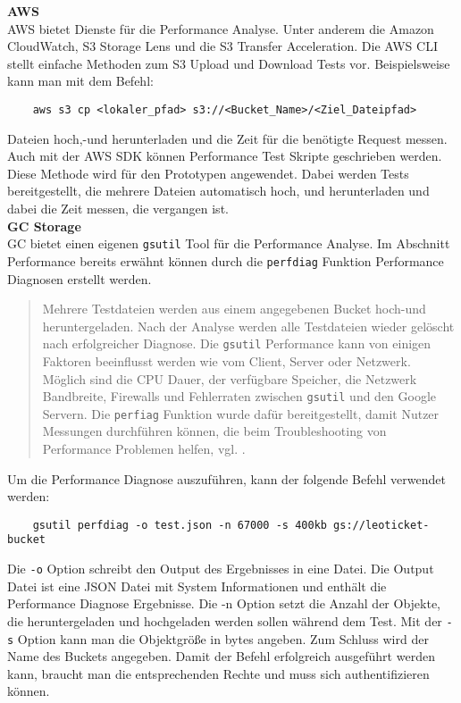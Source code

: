 \textbf{AWS}\\

AWS bietet Dienste für die Performance Analyse. Unter anderem die Amazon CloudWatch, S3 Storage Lens und die S3 Transfer Acceleration. Die AWS CLI stellt einfache Methoden zum S3 Upload und Download Tests vor. Beispielsweise kann man mit dem Befehl:

\begin{lstlisting}
	aws s3 cp <lokaler_pfad> s3://<Bucket_Name>/<Ziel_Dateipfad>
\end{lstlisting}

Dateien hoch,-und herunterladen und die Zeit für die benötigte Request messen. Auch mit der AWS SDK können Performance Test Skripte geschrieben werden. Diese Methode wird für den Prototypen angewendet. Dabei werden Tests bereitgestellt, die mehrere Dateien automatisch hoch, und herunterladen und dabei die Zeit messen, die vergangen ist.\\ 

\textbf{GC Storage}\\

GC bietet einen eigenen \verb|gsutil| Tool für die Performance Analyse. Im Abschnitt Performance bereits erwähnt können durch die \verb|perfdiag| Funktion Performance Diagnosen erstellt werden. 

\begin{quote}
	Mehrere Testdateien werden aus einem angegebenen Bucket hoch-und heruntergeladen. Nach der Analyse werden alle Testdateien wieder gelöscht nach erfolgreicher Diagnose. Die \verb|gsutil| Performance kann von einigen Faktoren beeinflusst werden wie vom Client, Server oder Netzwerk. Möglich sind die CPU Dauer, der verfügbare Speicher, die Netzwerk Bandbreite, Firewalls und Fehlerraten zwischen \verb|gsutil| und den Google Servern. Die \verb|perfiag| Funktion wurde dafür bereitgestellt, damit Nutzer Messungen durchführen können, die beim Troubleshooting von Performance Problemen helfen, vgl. \cite{gc-perfdiag}.
\end{quote}

Um die Performance Diagnose auszuführen, kann der folgende Befehl verwendet werden:

\begin{lstlisting}
	gsutil perfdiag -o test.json -n 67000 -s 400kb gs://leoticket-bucket
\end{lstlisting}

Die \verb|-o| Option schreibt den Output des Ergebnisses in eine Datei. Die Output Datei ist eine JSON Datei mit System Informationen und enthält die Performance Diagnose Ergebnisse. Die -n Option setzt die Anzahl der Objekte, die heruntergeladen und hochgeladen werden sollen während dem Test. Mit der \verb|-s| Option kann man die Objektgröße in bytes angeben. Zum Schluss wird der Name des Buckets angegeben. Damit der Befehl erfolgreich ausgeführt werden kann, braucht man die entsprechenden Rechte und muss sich authentifizieren können.\\

